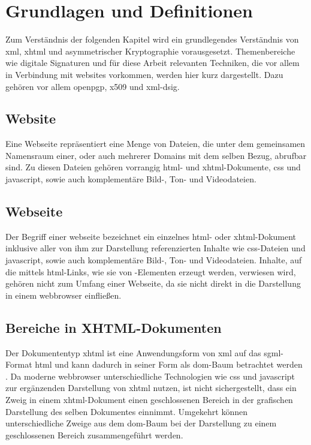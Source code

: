 
\chapter{Grundlagen und Definitionen}
\label{chap:GrundlagenDefinitionen}

Zum Verständnis der folgenden Kapitel wird ein grundlegendes Verständnis von \gls{xml}, \gls{xhtml} und asymmetrischer Kryptographie vorausgesetzt.
Themenbereiche wie digitale Signaturen und für diese Arbeit relevanten Techniken, die vor allem in Verbindung mit \glspl{website} vorkommen, werden hier kurz
dargestellt. Dazu gehören vor allem \gls{openpgp}, \gls{x509} und \gls{xml-dsig}.

\section{Website}
\label{sec:GrundlagenDefinitionen:Website}
Eine Webseite repräsentiert eine Menge von Dateien, die unter dem gemeinsamen Namensraum einer, oder auch mehrerer Domains mit dem selben Bezug, abrufbar sind.
Zu diesen Dateien gehören vorrangig \gls{html}- und \gls{xhtml}-Dokumente, \gls{css} und \gls{javascript}, sowie auch komplementäre Bild-, Ton- und
Videodateien.

\section{Webseite}
\label{sec:GrundlagenDefinitionen:Webseiten}
Der Begriff einer \gls{webseite} bezeichnet ein einzelnes \gls{html}- oder \gls{xhtml}-Dokument inklusive aller von ihm zur Darstellung referenzierten
Inhalte wie \gls{css}-Dateien und \gls{javascript}, sowie auch komplementäre Bild-, Ton- und Videodateien. Inhalte, auf die mittels \gls{html}-Links, wie sie
von -Elementen erzeugt werden, verwiesen wird, gehören nicht zum Umfang einer Webseite, da sie nicht direkt in die Darstellung in einem
\gls{webbrowser} einfließen.

\section{Bereiche in XHTML-Dokumenten}
\label{sec:GrundlagenDefinitionen:BereicheXHTML}
Der Dokumententyp \gls{xhtml} ist eine Anwendungsform von \gls{xml} auf das \gls{sgml}-Format \gls{html}\cite{xhtml:w3c} und kann dadurch in seiner Form als
\gls{dom}-Baum betrachtet werden \cite{xhtml:oreilly}. Da moderne \Gls{webbrowser} unterschiedliche Technologien wie \gls{css} und \gls{javascript} zur
ergänzenden Darstellung von \gls{xhtml} nutzen, ist nicht sichergestellt, dass ein Zweig in einem \gls{xhtml}-Dokument einen geschlossenen Bereich in der
grafischen Darstellung des selben Dokumentes einnimmt. Umgekehrt können unterschiedliche Zweige aus dem \gls{dom}-Baum bei der Darstellung zu einem
geschlossenen Bereich zusammengeführt werden.

